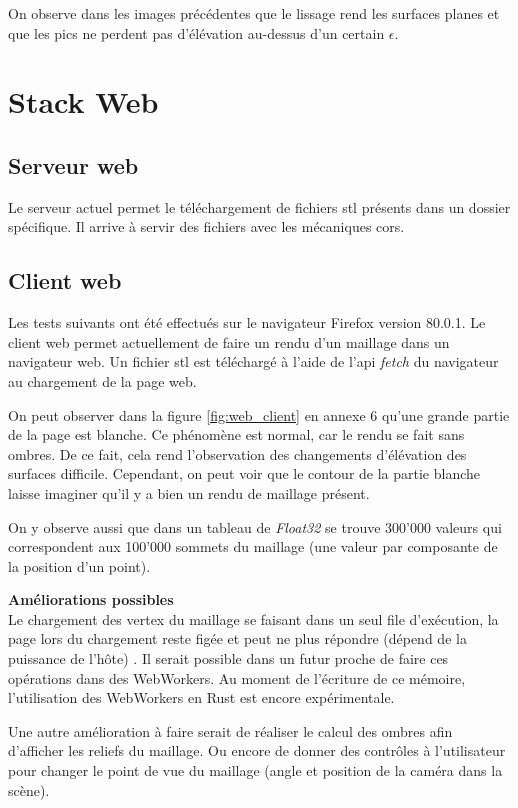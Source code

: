 On observe dans les images précédentes que le lissage rend les surfaces planes et que les pics ne perdent pas d'élévation au-dessus d'un certain $\epsilon$.

\section{Stack Web}
\subsection{Serveur web}

Le serveur actuel permet le téléchargement de fichiers \gls{stl} présents dans
un dossier spécifique. Il arrive à servir des fichiers avec les mécaniques \gls{cors}.

\subsection{Client web}
Les tests suivants ont été effectués sur le navigateur Firefox version 80.0.1.
Le client web permet actuellement de faire un rendu d'un maillage dans un
navigateur web. Un fichier \gls{stl} est téléchargé à l'aide de l'api
\textit{fetch} du navigateur au chargement de la page web.

On peut observer dans la figure \ref{fig:web_client} en annexe 6 qu'une grande partie de la page est blanche.
Ce phénomène est normal, car le rendu se fait sans ombres.
De ce fait, cela rend l'observation des changements d'élévation des surfaces difficile.
Cependant, on peut voir que le contour de la partie blanche laisse imaginer qu'il y a bien un rendu de maillage présent.

On y observe aussi que dans un tableau de \textit{Float32} se trouve 300'000 valeurs qui correspondent aux 100'000 sommets du maillage (une valeur par composante de la position d'un point).

\textbf{Améliorations possibles} \\
Le chargement des vertex du maillage se faisant dans un seul file d'exécution,
la page lors du chargement reste figée et peut ne plus répondre (dépend de la
puissance de l'hôte) .
Il serait possible dans un futur proche de faire ces opérations dans des WebWorkers. Au
moment de l'écriture de ce mémoire, l'utilisation des WebWorkers
en Rust est encore expérimentale.

Une autre amélioration à faire serait de réaliser le calcul des ombres afin d'afficher les reliefs du maillage.
Ou encore de donner des contrôles à l'utilisateur pour changer le point 
de vue du maillage (angle et position de la caméra dans la scène).
